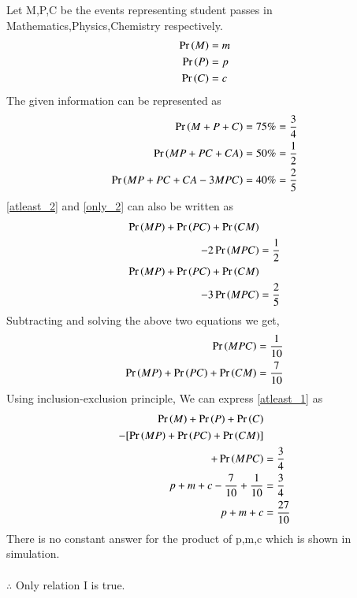 
Let M,P,C be the events representing student passes in Mathematics,Physics,Chemistry respectively.
\begin{align}
    \Pr\left(M\right)&=m\\
    \Pr\left(P\right)&=p\\
    \Pr\left(C\right)&=c
\end{align}
The given information can be represented as
\begin{align}
    \pr{M+P+C}=75\%=\dfrac{3}{4}\label{atleast_1}\\
    \pr{MP+PC+CA}=50\%=\dfrac{1}{2}\label{atleast_2}\\
    \pr{MP+PC+CA-3MPC}=40\%=\dfrac{2}{5} \label{only_2}
\end{align}
\eqref{atleast_2} and \eqref{only_2} can also be written as
\begin{align}
    \Pr\left(MP\right)+\Pr\left(PC\right)+\Pr\left(CM\right)&\nonumber\\-2\Pr\left(MPC\right)&=\dfrac{1}{2}\\
    \Pr\left(MP\right)+\Pr\left(PC\right)+\Pr\left(CM\right)&\nonumber\\-3\Pr\left(MPC\right)&=\dfrac{2}{5}
\end{align}
Subtracting and solving the above two equations we get,
\begin{align}
    \Pr\left(MPC\right)&=\dfrac{1}{10}\\
    \Pr\left(MP\right)+\Pr\left(PC\right)+\Pr\left(CM\right)&=\dfrac{7}{10}
\end{align}
Using inclusion-exclusion principle, We can express \eqref{atleast_1} as
\begin{align}
\Pr\left(M\right)+\Pr\left(P\right)+\Pr\left(C\right)&\nonumber\\
-[\Pr\left(MP\right)+\Pr\left(PC\right)+\Pr\left(CM\right)]&\nonumber\\
      +\Pr\left(MPC\right)&=\dfrac{3}{4}\\
    p+m+c-\dfrac{7}{10}+\dfrac{1}{10}&=\dfrac{3}{4}\\
    p+m+c&=\dfrac{27}{10}
\end{align}
There is no constant answer for the product of p,m,c which is shown in simulation.\\\\
\centering $\therefore$ Only relation I is true.
